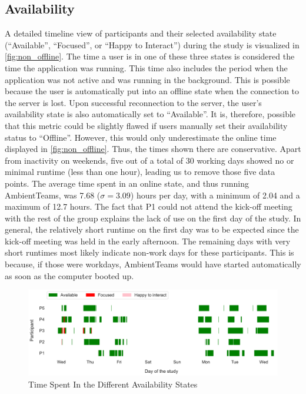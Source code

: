 \subsection{Availability}
A detailed timeline view of participants and their selected availability state (\enquote{Available}, \enquote{Focused}, or \enquote{Happy to Interact}) during the study is visualized in \autoref{fig:non_offline}. The time a user is in one of these three states is considered the time the application was running. This time also includes the period when the application was not active and was running in the background. This is possible because the user is automatically put into an offline state when the connection to the server is lost. Upon successful reconnection to the server, the user's availability state is also automatically set to \enquote{Available}. It is, therefore, possible that this metric could be slightly flawed if users manually set their availability status to \enquote{Offline}. However, this would only underestimate the online time displayed in \autoref{fig:non_offline}. Thus, the times shown there are conservative. Apart from inactivity on weekends, five out of a total of 30 working days showed no or minimal runtime (less than one hour), leading us to remove those five data points. The average time spent in an online state, and thus running AmbientTeams, was 7.68 ($\sigma=3.09$) hours per day, with a minimum of 2.04 and a maximum of 12.7 hours. The fact that P1 could not attend the kick-off meeting with the rest of the group explains the lack of use on the first day of the study. In general, the relatively short runtime on the first day was to be expected since the kick-off meeting was held in the early afternoon. The remaining days with very short runtimes most likely indicate non-work days for these participants. This is because, if those were workdays, AmbientTeams would have started automatically as soon as the computer booted up.

\begin{figure}[h]
    \centering
    \includegraphics[width=\linewidth]{plots/non_offline.pdf}
    \caption{Time Spent In the Different Availability States}
    \label{fig:non_offline}
\end{figure}

